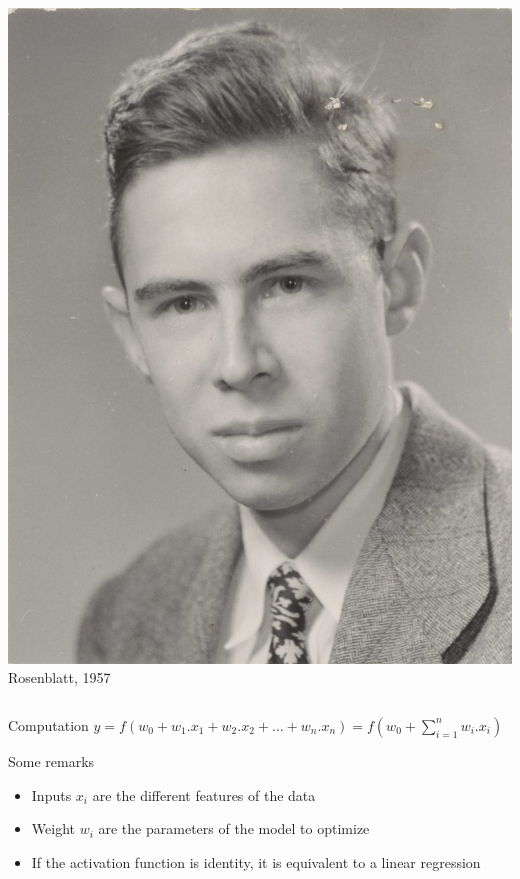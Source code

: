 \documentclass[handout, 10pt]{beamer}
\begin{document}
\begin{frame}
\begin{columns}
    \includegraphics[width=\textwidth]{fig/L2/Rosenblatt.jpg}
    Rosenblatt, 1957
  \end{columns}
 
\begin{block}{Computation}
$
y = f\left( w_0 + w_1. x_1 + w_2. x_2 +  \dots + w_n. x_n \right) = f\left( w_0 + \sum_{i=1}^n w_i.x_i\right)
$
\end{block}
\end{frame}

\begin{frame}{Some remarks}
\begin{itemize}[<+->]
    \item Inputs $x_i$ are the different features of the data
    \item Weight $w_i$ are the parameters of the model to optimize
    \item If the activation function is identity, it is equivalent to a linear regression
\end{itemize}

\end{frame}
\end{document}
